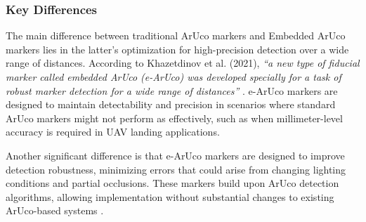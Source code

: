     \subsubsection{Key Differences}

    The main difference between traditional ArUco markers and Embedded ArUco markers lies in the latter's optimization for high-precision detection over a wide range of distances. According to Khazetdinov et al. (2021), \textit{“a new type of fiducial marker called embedded ArUco (e-ArUco) was developed specially for a task of robust marker detection for a wide range of distances”} \cite{khazetdinov2021}. e-ArUco markers are designed to maintain detectability and precision in scenarios where standard ArUco markers might not perform as effectively, such as when millimeter-level accuracy is required in UAV landing applications.

    Another significant difference is that e-ArUco markers are designed to improve detection robustness, minimizing errors that could arise from changing lighting conditions and partial occlusions. These markers build upon ArUco detection algorithms, allowing implementation without substantial changes to existing ArUco-based systems \cite{khazetdinov2021}.

